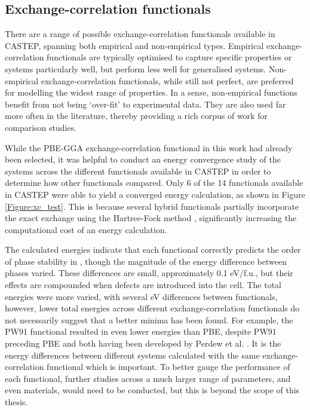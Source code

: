 \subsection{Exchange-correlation functionals}

There are a range of possible exchange-correlation functionals available in CASTEP, spanning both empirical and non-empirical types. Empirical exchange-correlation functionals are typically optimised to capture specific properties or systems particularly well, but perform less well for generalised systems. Non-empirical exchange-correlation functionals, while still not perfect, are preferred for modelling the widest range of properties. In a sense, non-empirical functions benefit from not being `over-fit' to experimental data. They are also used far more often in the literature, thereby providing a rich corpus of work for comparison studies.

While the PBE-GGA exchange-correlation functional in this work had already been selected, it was helpful to conduct an energy convergence study of the systems across the different functionals available in CASTEP in order to determine how other functionals compared. Only 6 of the 14 functionals available in CASTEP were able to yield a converged energy calculation, as shown in Figure \ref{Figure:xc_test}. This is because several hybrid functionals partially incorporate the exact exchange using the Hartree-Fock method \cite{hartree1928wave}, significantly increasing the computational cost of an energy calculation. 

The calculated energies indicate that each functional correctly predicts the order of phase stability in \zirconia , though the magnitude of the energy difference between phases varied. These differences are small, approximately 0.1 eV/f.u., but their effects are compounded when defects are introduced into the cell. The total energies were more varied, with several eV differences between functionals, however, lower total energies across different exchange-correlation functionals do not necessarily suggest that a better minima has been found. For example, the PW91 functional resulted in even lower energies than PBE, despite PW91 preceding PBE and both having been developed by Perdew et al. \cite{perdew1991unified, perdew1992atoms}. It is the energy differences between different systems calculated with the same exchange-correlation functional which is important. To better gauge the performance of each functional, further studies across a much larger range of parameters, and even materials, would need to be conducted, but this is beyond the scope of this thesis.

